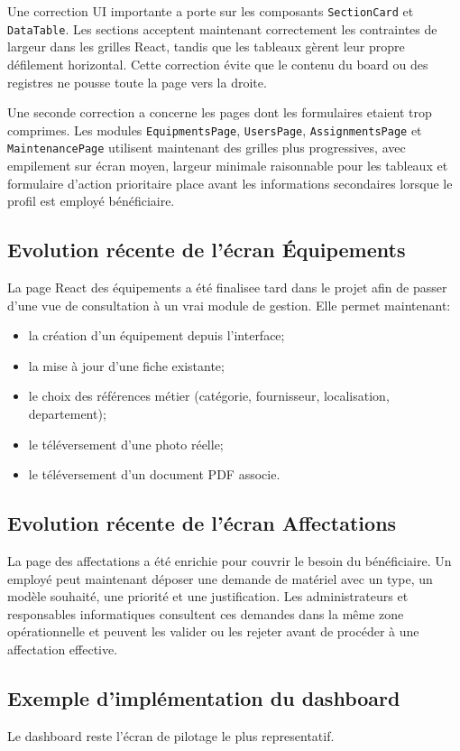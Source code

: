 ﻿\documentclass[12pt,a4paper,oneside]{report}
\begin{document}
Une correction UI importante a porte sur les composants \texttt{SectionCard} et \texttt{DataTable}. Les sections acceptent maintenant correctement les contraintes de largeur dans les grilles React, tandis que les tableaux gèrent leur propre défilement horizontal. Cette correction évite que le contenu du board ou des registres ne pousse toute la page vers la droite.

Une seconde correction a concerne les pages dont les formulaires etaient trop comprimes. Les modules \texttt{EquipmentsPage}, \texttt{UsersPage}, \texttt{AssignmentsPage} et \texttt{MaintenancePage} utilisent maintenant des grilles plus progressives, avec empilement sur écran moyen, largeur minimale raisonnable pour les tableaux et formulaire d'action prioritaire place avant les informations secondaires lorsque le profil est employé bénéficiaire.

\subsection{Evolution récente de l'écran Équipements}
La page React des équipements a été finalisee tard dans le projet afin de passer d'une vue de consultation à un vrai module de gestion. Elle permet maintenant:
\begin{itemize}
  \item la création d'un équipement depuis l'interface;
  \item la mise à jour d'une fiche existante;
  \item le choix des références métier (catégorie, fournisseur, localisation, departement);
  \item le téléversement d'une photo réelle;
  \item le téléversement d'un document PDF associe.
\end{itemize}

\subsection{Evolution récente de l'écran Affectations}
La page des affectations a été enrichie pour couvrir le besoin du bénéficiaire. Un employé peut maintenant déposer une demande de matériel avec un type, un modèle souhaité, une priorité et une justification. Les administrateurs et responsables informatiques consultent ces demandes dans la même zone opérationnelle et peuvent les valider ou les rejeter avant de procéder à une affectation effective.

\subsection{Exemple d'implémentation du dashboard}
Le dashboard reste l'écran de pilotage le plus representatif.
\end{document}
